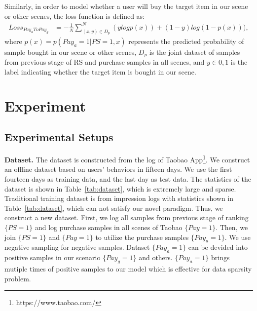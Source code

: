 \documentclass[sigconf]{acmart}
\begin{document}
Similarly, in order to model whether a user will buy the target item in our scene or other scenes, the loss function is defined as:
{\setlength\abovedisplayskip{0pt}
\begin{equation}
\begin{aligned}
    Loss_{Pay_aToPay_g} &= - \frac{1}{N} \sum_{(x,y) \in D_{p}}^N (ylogp(x)) + (1-y)log(1-p(x))), 
\end{aligned}
\end{equation}
\setlength\belowdisplayskip{0pt}} where $p(x)=p(Pay_a=1|PS=1, x)$ represents the predicted probability of sample bought in our scene or other scenes, $D_{p}$ is the joint dataset of samples from previous stage of RS and purchase samples in all scenes, and $y \in {0, 1}$ is the label indicating whether the target item is bought in our scene.



\section{Experiment}

\subsection{Experimental Setups}
\textbf{Dataset.} The dataset is constructed from the log of Taobao App\footnote{https://www.taobao.com/}. We construct an offline dataset based on users’ behaviors in fifteen days. We use the first fourteen days as training data, and the last day as test data. The statistics of the dataset is shown in Table~\ref{tab:dataset}, which is extremely large and sparse. 
Traditional training dataset is from impression logs with statistics shown in Table~\ref{tab:dataset}, which can not satisfy our novel paradigm. Thus, we construct a new dataset. First, we log all samples from previous stage of ranking $\{PS=1\}$ and log purchase samples in all scenes of Taobao $\{Pay=1\}$. Then, we join $\{PS=1\}$ and $\{Pay=1\}$ to utilize the purchase samples $\{Pay_a=1\}$. We use negative sampling for negative samples. Dataset $\{Pay_a=1\}$ can be devided into positive samples in our scenario $\{Pay_g=1\}$ and others. $\{Pay_a=1\}$ brings mutiple times of positive samples to our model which is effective for data sparsity problem.
\end{document}
